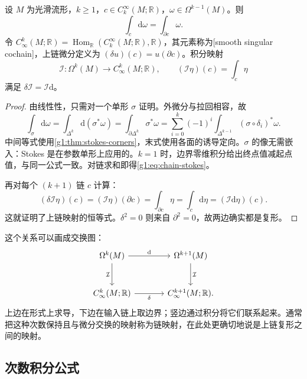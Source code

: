 \begin{theorem}
	\label{g1:thm:integration-chain-map}
	设 \(M\) 为光滑流形，\(k\geq1\)，\(c\in C_k^\infty(M;\mathbb R)\)，\(\omega\in\Omega^{k-1}(M)\)。则
	\begin{equation}\label{g1:eq:chain-stokes}
		\int_c\mathrm{d}\omega=\int_{\partial c}\omega.
	\end{equation}
	令 \(C^k_\infty(M;\mathbb R)=\operatorname{Hom}_{\mathbb R}(C_k^\infty(M;\mathbb R),\mathbb R)\)，其元素称为[smooth singular cochain]，上链微分定义为 \((\delta u)(c)=u(\partial c)\)。积分映射
	\[
		\mathcal I:\Omega^k(M)\longrightarrow C^k_\infty(M;\mathbb R),\qquad
		(\mathcal I\eta)(c)=\int_c\eta
	\]
	满足 \(\delta\mathcal I=\mathcal I\mathrm{d}\)。
\end{theorem}
\begin{proof}
	由线性性，只需对一个单形 \(\sigma\) 证明。外微分与拉回相容，故
	\[
		\int_\sigma\mathrm{d}\omega
		=\int_{\Delta^k}\mathrm{d}(\sigma^*\omega)
		=\int_{\partial\Delta^k}\sigma^*\omega
		=\sum_{i=0}^k(-1)^i\int_{\Delta^{k-1}}(\sigma\circ\delta_i)^*\omega.
	\]
	中间等式使用\cref{g1:thm:stokes-corners}，末式使用各面的诱导定向。\(\sigma\) 的像无需嵌入：Stokes 是在参数单形上应用的。\(k=1\) 时，边界零维积分给出终点值减起点值，与同一公式一致。对链求和即得\eqref{g1:eq:chain-stokes}。

	再对每个 \((k+1)\) 链 \(c\) 计算：
	\[
		(\delta\mathcal I\eta)(c)
		=(\mathcal I\eta)(\partial c)
		=\int_{\partial c}\eta
		=\int_c\mathrm{d}\eta
		=(\mathcal I\mathrm{d}\eta)(c).
	\]
	这就证明了上链映射的恒等式。\(\delta^2=0\) 则来自 \(\partial^2=0\)，故两边确实都是复形。
\end{proof}

这个关系可以画成交换图：
\[
	\begin{tikzcd}[column sep=large,row sep=large]
		\Omega^k(M) \arrow[r,"\mathrm{d}"] \arrow[d,"\mathcal I"'] & \Omega^{k+1}(M) \arrow[d,"\mathcal I"] \\
		C^k_\infty(M;\mathbb R) \arrow[r,"\delta"'] & C^{k+1}_\infty(M;\mathbb R).
	\end{tikzcd}
\]
上边在形式上求导，下边在输入链上取边界；竖边通过积分将它们联系起来。通常把这种次数保持且与微分交换的映射称为链映射，在此处更确切地说是上链复形之间的映射。

\subsection{次数积分公式}
\label{g1:subsec:1405:03}

